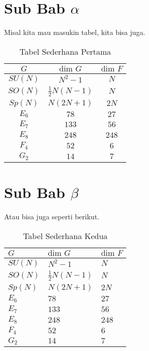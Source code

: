 \section{Sub Bab \texorpdfstring{$\alpha$}{α}}
\noindent Misal kita mau masukin tabel, kita bisa juga.
\begin{table}[H]
  \caption{Tabel Sederhana Pertama}
  \label{co:tabel1}
  \begin{center}
    \begin{tabular}{ |c|c|c| }
      \hline
      $G$     & $\text{dim }G$      & $\text{dim }F$ \\
      \hline
      $SU(N)$ & $N^2 -1$            & $N$            \\
      $SO(N)$ & $\frac{1}{2}N(N-1)$ & $N$            \\
      $Sp(N)$ & $N(2N+1)$           & $2N$           \\
      $E_6$   & $78$                & $27$           \\
      $E_7$   & $133$               & $56$           \\
      $E_8$   & $248$               & $248$          \\
      $F_4$   & $52$                & $6$            \\
      $G_2$   & $14$                & $7$            \\
      \hline
    \end{tabular}
  \end{center}
\end{table}

\section{Sub Bab \texorpdfstring{$\beta$}{ꞵ}}
\noindent Atau bisa juga seperti berikut.
\begin{table}[H]
  \caption{Tabel Sederhana Kedua}
  \label{co:tabel2}
  \begin{center}
    \begin{tabularx}{0.8\textwidth} {
      |>{\raggedright\arraybackslash}X
      |>{\raggedright\arraybackslash}X
      |>{\raggedright\arraybackslash}X
      |}
      \hline
      $G$     & $\text{dim }G$      & $\text{dim }F$ \\
      \hline
      $SU(N)$ & $N^2 -1$            & $N$            \\
      $SO(N)$ & $\frac{1}{2}N(N-1)$ & $N$            \\
      $Sp(N)$ & $N(2N+1)$           & $2N$           \\
      $E_6$   & $78$                & $27$           \\
      $E_7$   & $133$               & $56$           \\
      $E_8$   & $248$               & $248$          \\
      $F_4$   & $52$                & $6$            \\
      $G_2$   & $14$                & $7$            \\
      \hline
    \end{tabularx}
  \end{center}
\end{table}
